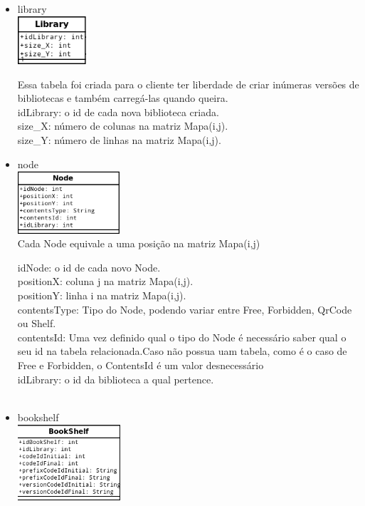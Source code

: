 \documentclass[a4paper,10pt]{article}
\begin{document}
\begin{itemize}
\item{library}\\[0.3cm]
\includegraphics[width=0.20\textwidth]{./imgs/librayBD.png} 

Essa tabela foi criada para o cliente ter liberdade de criar inúmeras versões de bibliotecas e também carregá-las quando queira.\\

idLibrary: o id de cada nova biblioteca criada.\\
size\_X: número de colunas na matriz Mapa(i,j).\\
size\_Y: número de linhas na matriz Mapa(i,j).\\


\item{node}\\[0.3cm]	
\includegraphics[width=0.30\textwidth]{./imgs/nodeBD.png}\\

Cada Node equivale a uma posição na matriz Mapa(i,j)

idNode: o id de cada novo Node. \\
positionX: coluna j na matriz Mapa(i,j). \\
positionY: linha i na matriz Mapa(i,j).\\
contentsType: Tipo do Node, podendo variar entre Free, Forbidden, QrCode ou Shelf.\\
contentsId: Uma vez definido qual o tipo do Node é necessário saber qual o seu id na tabela relacionada.Caso não possua uam tabela, como é o caso
 de Free e Forbidden, o ContentsId é um valor desnecessário\\
idLibrary: o id da biblioteca a qual pertence.\\\\

\item{bookshelf}\\[0.3cm]
\includegraphics[width=0.30\textwidth]{./imgs/bookShelfBD.png}\\	


\end{itemize}
\end{document}
